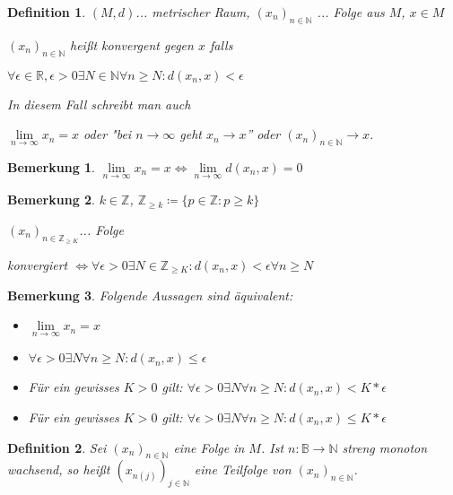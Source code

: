 \documentclass[twocolumn]{article}
\newtheorem{definition}{Definition}[section]
\newtheorem*{remark}{Bemerkung}
\newcommand*{\logeq}{\Leftrightarrow}
\begin{document}
\begin{definition}
	$(M,d)$... metrischer Raum, $(x_{n})_{n \in \mathbb{N}}$ ... Folge aus $M$, $x \in M$
	
	$(x_{n})_{n \in \mathbb{N}}$ heißt konvergent gegen $x$ falls
	
	$\forall \epsilon \in \mathbb{R}, \epsilon > 0 \exists N \in \mathbb{N} \forall n \geq N : d(x_{n},x)< \epsilon$
	
	In diesem Fall schreibt man auch
	
	$\lim\limits_{n\rightarrow \infty}x_{n}=x$ oder "bei $n \rightarrow \infty$ geht $x_{n}\rightarrow x$'' oder $(x_{n})_{n \in \mathbb{N}}\rightarrow x$.
\end{definition}

\begin{remark}
	$\lim\limits_{n\rightarrow\infty}x_{n}=x \logeq \lim\limits_{n\rightarrow\infty}d(x_{n},x)=0$
\end{remark}

\begin{remark}
	$k \in \mathbb{Z}$, $\mathbb{Z}_{\geq k}\coloneqq\{p \in \mathbb{Z}: p \geq k\}$
	
	$(x_{n})_{n \in \mathbb{Z}_{\geq K}}$... Folge
	
	konvergiert $\logeq \forall \epsilon > 0 \exists N \in \mathbb{Z}_{\geq K}:d(x_{n},x)<\epsilon\forall n \geq N$
	
\end{remark}

\begin{remark}
	Folgende Aussagen sind äquivalent:
	
	\begin{itemize}
		\item $\lim\limits_{n\rightarrow\infty}x_{n}=x$
		\item $\forall\epsilon >0\exists N \forall n \geq N : d(x_{n},x)\leq \epsilon$
		\item Für ein gewisses $K>0$ gilt: $\forall \epsilon > 0 \exists N \forall n \geq N : d(x_{n},x)< K*\epsilon$
		\item Für ein gewisses $K>0$ gilt: $\forall \epsilon > 0 \exists N \forall n \geq N: d(x_{n},x)\leq K*\epsilon$
	\end{itemize}
\end{remark}

\begin{definition}
	Sei $(x_{n})_{n \in \mathbb{N}}$ eine Folge in $M$. Ist $n:\mathbb{B}\rightarrow\mathbb{N}$ streng monoton wachsend, so heißt $(x_{n(j)})_{j\in \mathbb{N}}$ eine Teilfolge von $(x_{n})_{n \in \mathbb{N}}$.
\end{definition}
\end{document}
